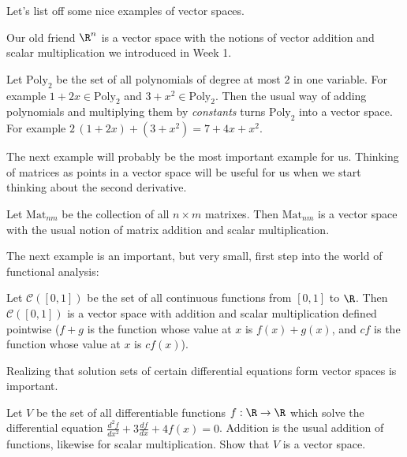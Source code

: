 \documentclass{ximera}
\begin{document}
Let's list off some nice examples of vector spaces.

\begin{example}
  Our old friend $\R^n$ is a vector space with the notions of vector addition and scalar multiplication we introduced in Week 1.
\end{example}

\begin{example}
  Let $\text{Poly}_2$ be the set of all polynomials of degree at most $2$ in one variable.  For example $1+2x \in \text{Poly}_2$ and $3+x^2 \in \text{Poly}_2$.  Then the usual way of 
  adding polynomials and multiplying them by \textit{constants} turns $\text{Poly}_2$ into a vector space.  For example $2 \, (1+2x)+(3+x^2)  = 7+4x+x^2$.
\end{example}
		
The next example will probably be the most important example for us.  Thinking of matrices as points in a vector space will be useful for us when we 
start thinking about the second derivative.
	
\begin{example}
  Let $\text{Mat}_{nm}$ be the collection of all $n \times m$ matrixes.  Then $\text{Mat}_{nm}$ is a vector space with the usual notion of matrix addition and scalar multiplication.
\end{example}
	
The next example is an important, but very small, first step into the world of functional analysis:
	
\begin{example}
  Let $\mathcal{C}([0,1])$ be the set of all continuous functions from $[0,1]$ to $\R$.  Then $\mathcal{C}([0,1])$ is a vector space with addition and scalar 
  multiplication defined pointwise ($f+g$ is the function whose value at $x$ is $f(x)+g(x)$, and $cf$ is the function whose value at $x$ is $cf(x)$).
\end{example}
	
Realizing that solution sets of certain differential equations form vector spaces is important.
	

Let $V$ be the set of all differentiable functions $f: \R \to \R$ which solve the differential equation $\frac{d^2f}{dx^2} + 3\frac{df}{dx} +4f(x) = 0$.
Addition is the usual addition of functions, likewise for scalar multiplication.  Show that $V$ is a vector space.
		
\end{document}
